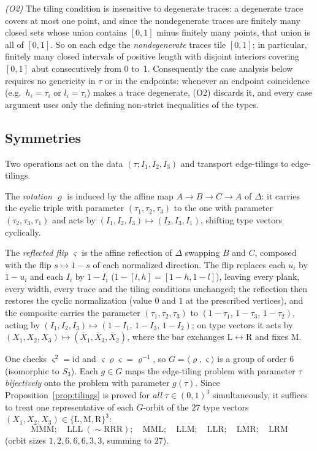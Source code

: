 \documentclass[11pt,reqno]{amsart}
\theoremstyle{plain}
\theoremstyle{definition}
\theoremstyle{remark}
\begin{document}
\emph{(O2)} The tiling condition is insensitive to degenerate traces: a
degenerate trace covers at most one point, and since the nondegenerate traces
are finitely many closed sets whose union contains $[0,1]$ minus finitely many
points, that union is all of $[0,1]$. So on each edge the \emph{nondegenerate}
traces tile $[0,1]$; in particular, finitely many closed intervals of positive
length with disjoint interiors covering $[0,1]$ abut consecutively from $0$
to~$1$. Consequently the case analysis below requires no genericity in $\tau$
or in the endpoints: whenever an endpoint coincidence (e.g.\ $h_i=\tau_i$ or
$l_i=\tau_i$) makes a trace degenerate, (O2) discards it, and every case
argument uses only the defining non-strict inequalities of the types.

\subsection*{Symmetries}
Two operations act on the data $(\tau;I_1,I_2,I_3)$ and transport edge-tilings
to edge-tilings.

The \emph{rotation} $\varrho$ is induced by the affine map $A\to B\to C\to A$
of $\Delta$: it carries the cyclic triple with parameter
$(\tau_1,\tau_2,\tau_3)$ to the one with parameter $(\tau_2,\tau_3,\tau_1)$ and
acts by $(I_1,I_2,I_3)\mapsto(I_2,I_3,I_1)$, shifting type vectors cyclically.

The \emph{reflected flip} $\varsigma$ is the affine reflection of $\Delta$
swapping $B$ and $C$, composed with the flip $s\mapsto1-s$ of each normalized
direction. The flip replaces each $u_i$ by $1-u_i$ and each $I_i$ by $1-I_i$
($1-[l,h]=[1-h,1-l]$), leaving every plank, every width, every trace and the
tiling conditions unchanged; the reflection then restores the cyclic
normalization (value $0$ and $1$ at the prescribed vertices), and the composite
carries the parameter $(\tau_1,\tau_2,\tau_3)$ to
$(1-\tau_1,\,1-\tau_3,\,1-\tau_2)$, acting by
$(I_1,I_2,I_3)\mapsto(1-I_1,\,1-I_3,\,1-I_2)$; on type vectors it acts by
$(X_1,X_2,X_3)\mapsto(\bar X_1,\bar X_3,\bar X_2)$, where the bar exchanges
$\mathrm L\leftrightarrow\mathrm R$ and fixes $\mathrm M$.

One checks $\varsigma^2=\mathrm{id}$ and
$\varsigma\varrho\varsigma=\varrho^{-1}$, so
$G=\langle\varrho,\varsigma\rangle$ is a group of order $6$ (isomorphic to
$S_3$). Each $g\in G$ maps the edge-tiling problem with parameter $\tau$
\emph{bijectively} onto the problem with parameter $g(\tau)$. Since
Proposition~\ref{prop:tilings} is proved for \emph{all} $\tau\in(0,1)^3$
simultaneously, it suffices to treat one representative of each $G$-orbit of
the $27$ type vectors $(X_1,X_2,X_3)\in\{\mathrm L,\mathrm M,\mathrm R\}^3$:
\[
\mathrm{MMM};\quad \mathrm{LLL}\ (\sim\mathrm{RRR});\quad \mathrm{MML};\quad
\mathrm{LLM};\quad \mathrm{LLR};\quad \mathrm{LMR};\quad \mathrm{LRM}
\]
(orbit sizes $1,2,6,6,6,3,3$, summing to $27$).
\end{document}

